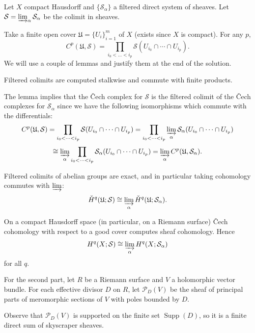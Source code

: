 \documentclass[12pt]{article}
\begin{document}
\begin{solution}
    Let $X$ compact Hausdorff and $\{\mathcal{S}_\alpha\}$ a filtered direct system of sheaves. Let $\mathcal{S} = \varinjlim_\alpha \mathcal{S}_\alpha$ be the colimit in sheaves.

    Take a finite open cover $\mathfrak{U} = \{U_i\}_{i=1}^m$ of $X$ (exists since $X$ is compact). For any $p$,
    \[
        C^p(\mathfrak{U},\mathcal{S}) = \prod_{i_0<\dots<i_p} \mathcal{S}(U_{i_0}\cap\cdots\cap U_{i_p}).
    \]
    We will use a couple of lemmas and justify them at the end of the solution.
    \begin{lemma}\label{lem:filtered-colim-stalkwise}
        Filtered colimits are computed stalkwise and commute with finite products.
    \end{lemma}
    The lemma implies that the Čech complex for $\mathcal{S}$ is the filtered colimit of the Čech complexes for $\mathcal{S}_\alpha$ since we have the following isomorphisms which commute with the differentials:
    \[
        C^p(\mathfrak{U},\mathcal{S}) = \prod_{i_0<\dots<i_p} \mathcal{S}(U_{i_0}\cap\cdots\cap U_{i_p}) = \prod_{i_0<\dots<i_p} \varinjlim_\alpha \mathcal{S}_\alpha(U_{i_0}\cap\cdots\cap U_{i_p})
    \]
    \[
        \cong \varinjlim_\alpha \prod_{i_0<\dots<i_p} \mathcal{S}_\alpha(U_{i_0}\cap\cdots\cap U_{i_p}) = \varinjlim_\alpha C^p(\mathfrak{U},\mathcal{S}_\alpha).
    \]


    \begin{lemma}\label{lem:filtered-colim-exact}
        Filtered colimits of abelian groups are exact, and in particular taking cohomology commutes with $\varinjlim$:
        \[
            \check{H}^q(\mathfrak{U};\mathcal{S}) \cong \varinjlim_\alpha \check{H}^q(\mathfrak{U};\mathcal{S}_\alpha).
        \]
    \end{lemma}
    On a compact Hausdorff space (in particular, on a Riemann surface) Čech cohomology with respect to a good cover computes sheaf cohomology. Hence
    \[
        H^q(X;\mathcal{S}) \cong \varinjlim_\alpha H^q(X;\mathcal{S}_\alpha)
    \]
    for all $q$.

    For the second part, let $R$ be a Riemann surface and $V$ a holomorphic vector bundle. For each effective divisor $D$ on $R$, let $\mathcal{P}_D(V)$ be the sheaf of principal parts of meromorphic sections of $V$ with poles bounded by $D$.

    Observe that $\mathcal{P}_D(V)$ is supported on the finite set $\operatorname{Supp}(D)$, so it is a finite direct sum of skyscraper sheaves.


\end{solution}
\end{document}
